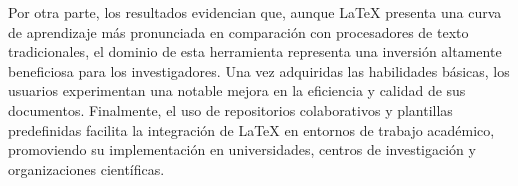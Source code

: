 \documentclass[12pt,twocolumn]{article}
\begin{document}
    Por otra parte, los resultados evidencian que, aunque LaTeX presenta una curva de aprendizaje más pronunciada en comparación con procesadores de texto tradicionales, el dominio de esta herramienta representa una inversión altamente beneficiosa para los investigadores. 
    Una vez adquiridas las habilidades básicas, los usuarios experimentan una notable mejora en la eficiencia y calidad de sus documentos. Finalmente, el uso de repositorios colaborativos y plantillas predefinidas facilita la integración de LaTeX en entornos de trabajo académico, promoviendo su implementación en universidades, centros de investigación y organizaciones científicas.

%
\printbibliography
%
\end{document}
